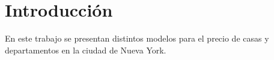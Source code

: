 
\section{Introducción}
\label{sec:intro}

En este trabajo se presentan distintos modelos para el precio de casas y departamentos en la ciudad de Nueva York. 